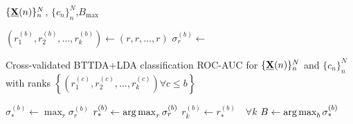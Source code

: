 \begin{algorithmic}[1]
  \Require $\{\underline{\mathbf{X}}(n)\}_n^N$, $\{c_n\}_n^N$,$B_\text{max}$

  \State $\textstyle{\left(r_1^{(b)},r_2^{(b)},\ldots,r_k^{(b)}\right) \gets
  \left(r,r,\ldots,r\right)}$
  \State $\sigma^{(b)}_r \gets$ \parbox[t]{5cm}{Cross-validated BTTDA+LDA classification
  ROC-AUC for $\{\underline{\mathbf{X}}(n)\}_n^N$ and $\{c_n\}_n^N$ with ranks  $\left\{\left(r_1^{(c)},r_2^{(c)},\ldots,r_k^{(c)}\right) \forall
c\leq b\right\}$}
  \EndFor
  \State $\textstyle{\sigma^{(b)}_* \gets \max_r\sigma^{(b)}_r}$
  \State $\textstyle{r^{(b)}_* \gets \operatorname*{arg\,max}_r\sigma^{(b)}_r}$
  \State $r_k^{(b)}\gets r^{(b)}_*\quad\forall k$
  \EndFor
  \State $\textstyle{B\gets\operatorname*{arg\,max}_b\sigma^{(b)}_*}$
\end{algorithmic}
